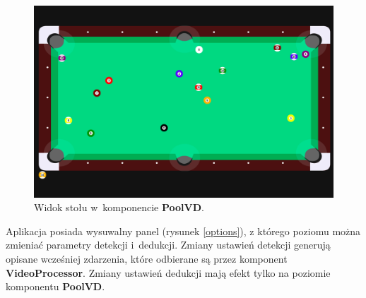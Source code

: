 \documentclass[12pt]{article}
\begin{document}
\begin{figure}[!htb]
    \centering
    \includegraphics[width=15cm]{./images/pool1.png}
    \caption{Widok stołu w~komponencie \textbf{PoolVD}.}
    \label{pool1}
\end{figure}

Aplikacja posiada wysuwalny panel (rysunek \ref{options}), z którego poziomu można zmieniać parametry detekcji i~dedukcji. Zmiany ustawień detekcji generują opisane wcześniej zdarzenia, które odbierane są przez komponent \textbf{VideoProcessor}. Zmiany ustawień dedukcji mają efekt tylko na poziomie komponentu \textbf{PoolVD}.
\end{document}
